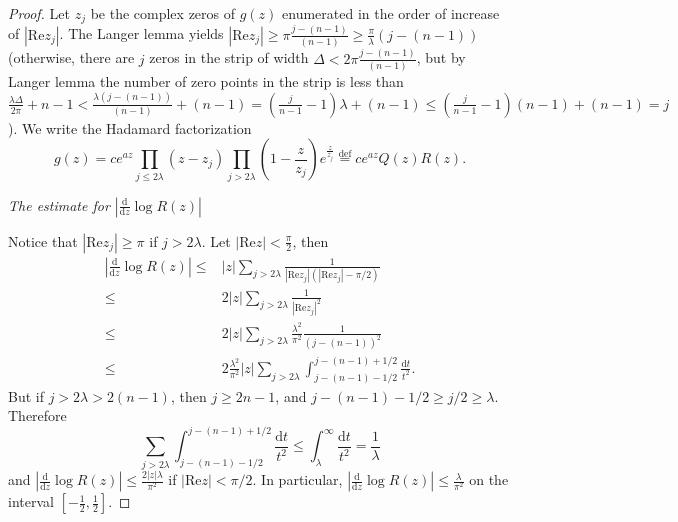 \begin{proof}
  Let  $z_j$ be the complex zeros of $g(z)$ enumerated in the order of increase of $\left| \mathrm{Re}z_j \right| $. The Langer lemma yields $\left| \mathrm{Re}z_j \right| \ge  \pi \frac{j-(n-1)}{(n-1)}\ge \frac{\pi}{\lambda}\left( j-(n-1) \right) $ (otherwise,  there are $j$ zeros in the strip of width $\Delta <  2\pi \frac{j-(n-1)}{(n-1)}$, but by Langer lemma the number of zero points in the strip is less than $\frac{\lambda\Delta}{2\pi}+n-1< \frac{\lambda (j-(n-1))}{(n-1)}+(n-1)=  \left( \frac{j}{n-1}-1 \right)  \lambda+(n-1)\le \left( \frac{j}{n-1}-1 \right) (n-1)+(n-1)=j $). We write the Hadamard factorization 
  \[
    g(z)=ce^{az}\prod_{j\le 2\lambda}(z-z_j)\prod_{j>2\lambda}\left( 1- \frac{z}{z_j} \right) e^{\frac{z}{z_j}}\overset{\mathrm{def}}{=}ce^{az}Q(z)R(z).
\] 

\textit{The estimate for $\left| \frac{\mathrm{d}}{\mathrm{d}z}\log R(z) \right| $}

Notice that $\left| \mathrm{Re} z_j \right| \ge \pi$ if $j>2\lambda$. Let $\left| \mathrm{Re}z \right| <\frac{\pi}{2}$, then
  \begin{equation*}
    \begin{aligned}
      \left| \frac{\mathrm{d}}{\mathrm{d}z}\log R(z) \right| \le  & \left| z \right| \sum_{j>2\lambda} \frac{1}{\left| \mathrm{Re}z_j \right| \left( \left| \mathrm{Re}z_j \right| -\pi /2 \right) }\\
      \le  & 2\left| z \right| \sum_{j>2\lambda} \frac{1}{|\mathrm{Re}z_j|^2}\\
      \le &  2\left| z \right| \sum_{j>2\lambda} \frac{\lambda^2}{\pi^2} \frac{1}{(j-(n-1))^2}\\
      \le  & 2 \frac{\lambda^2}{\pi^2}\left| z \right| \sum_{j>2\lambda}\int_{j-(n-1)-1 /2}^{j-(n-1)+1 /2} \frac{\mathrm{d}t}{t^2}.
    \end{aligned}
  \end{equation*} 
  But if $j>2\lambda>2(n-1)$, then $j\ge 2n-1$, and $j-(n-1)-1 /2\ge j /2\ge \lambda$. Therefore
  \[
    \sum_{j>2\lambda}\int_{j-(n-1)-1 /2}^{j-(n-1)+1 /2} \frac{\mathrm{d}t}{t^2}\le  \int_{\lambda}^{\infty} \frac{\mathrm{d}t}{t^2}=\frac{1}{\lambda}
  \] 
  and $\left|  \frac{\mathrm{d}}{\mathrm{d}z}\log R(z) \right| \le  \frac{2\left| z \right| \lambda}{\pi^2}$ if $\left| \mathrm{Re}z \right| <\pi /2$. In particular, $\left| \frac{\mathrm{d}}{\mathrm{d}z}\log R(z) \right| \le  \frac{\lambda}{\pi^2}$ on the interval $\left[ -\frac{1}{2},\frac{1}{2} \right] $.


\end{proof}
